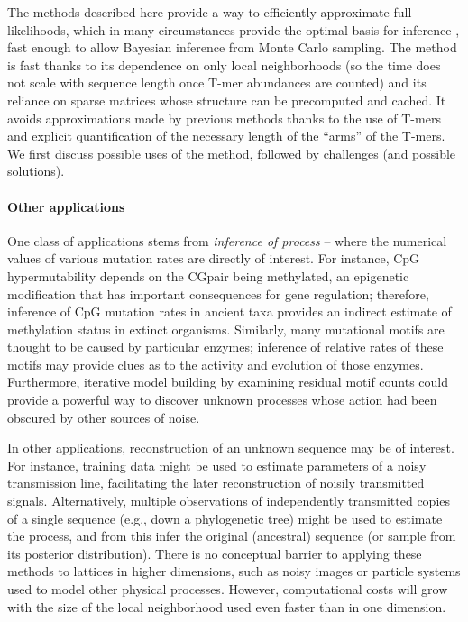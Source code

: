 \documentclass{article}
\newcommand{\nC}{\mbox{C}}
\newcommand{\nG}{\mbox{G}}
\theoremstyle{plain}
\theoremstyle{definition}
\begin{document}
The methods described here provide a way to efficiently approximate full likelihoods,
which in many circumstances provide the optimal basis for inference \citep{neyman1933problem},
fast enough to allow Bayesian inference from Monte Carlo sampling.
The method is fast thanks to its dependence on only local neighborhoods
(so the time does not scale with sequence length once T-mer abundances are counted)
and its reliance on sparse matrices whose structure can be precomputed and cached.
It avoids approximations made by previous methods thanks to the use of T-mers
and explicit quantification of the necessary length of the ``arms'' of the T-mers.
We first discuss possible uses of the method,
followed by challenges (and possible solutions).


\paragraph{Other applications}
One class of applications stems from \emph{inference of process} --
where the numerical values of various mutation rates are directly of interest.
For instance, CpG hypermutability depends on the \nC\nG pair being methylated,
an epigenetic modification that has important consequences for gene regulation;
therefore, inference of CpG mutation rates in ancient taxa provides an indirect estimate
of methylation status in extinct organisms.
Similarly, many mutational motifs are thought to be caused by particular enzymes;
inference of relative rates of these motifs
may provide clues as to the activity and evolution of those enzymes.
Furthermore, iterative model building by examining residual motif counts
could provide a powerful way to discover unknown processes
whose action had been obscured by other sources of noise.

In other applications, reconstruction of an unknown sequence may be of interest.
For instance, training data might be used to estimate parameters of a noisy transmission line,
facilitating the later reconstruction of noisily transmitted signals.
Alternatively, multiple observations of independently transmitted copies of a single sequence
(e.g., down a phylogenetic tree)
might be used to estimate the process, and from this infer the original (ancestral) sequence
(or sample from its posterior distribution).
There is no conceptual barrier to applying these methods to lattices in higher dimensions,
such as noisy images or particle systems used to model other physical processes.
However, computational costs will grow with the size of the local neighborhood used
even faster than in one dimension. 
\end{document}
